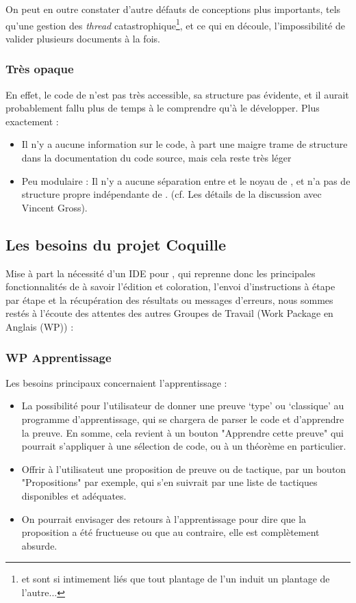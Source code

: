         On peut en outre constater d'autre défauts de conceptions plus importants, tels qu'une gestion des \emph{thread} catastrophique\footnote{\coqtop{} et \coqide{} sont si intimement liés que tout plantage de l'un induit un plantage de l'autre...}, et ce qui en découle, l'impossibilité de valider plusieurs documents à la fois.
			
        \subsubsection{Très opaque}

		En effet, le code de \coqide{} n'est pas très accessible, sa structure pas évidente, et il aurait probablement fallu plus de temps à le comprendre qu'à le développer. Plus exactement :
		\begin{itemize}
			\item Il n'y a aucune information sur le code, à part une maigre trame de structure dans la documentation du code source, mais cela reste très léger
			\item Peu modulaire : Il n'y a aucune séparation entre \coqide{} et le noyau de \coq{}, et \coqide{} n'a pas de structure propre indépendante de \coq{}. (cf. Les détails de la discussion avec Vincent Gross).	
		\end{itemize}
		
	\subsection{Les besoins du projet Coquille}

		Mise à part la nécessité d'un IDE pour \coq{}, qui reprenne donc les principales fonctionnalités de \coqide{} à savoir l'édition et coloration, l'envoi d'instructions à \coqtop{} étape par étape et la récupération des résultats ou messages d'erreurs, nous sommes restés à l'écoute des attentes des autres Groupes de Travail (Work Package en Anglais (WP)) :
        
        \subsubsection{WP Apprentissage}

        Les besoins principaux concernaient l'apprentissage :
		\begin{itemize}
			\item La possibilité pour l'utilisateur de donner une preuve `type' ou `classique' au programme d'apprentissage, qui se chargera de parser le code et d'apprendre la preuve. En somme, cela revient à un bouton "Apprendre cette preuve" qui pourrait s'appliquer à une sélection de code, ou à un théorème en particulier.
			\item Offrir à l'utilisateut une proposition de preuve ou de tactique, par un bouton "Propositions" par exemple, qui s'en suivrait par une liste de tactiques disponibles et adéquates.
			\item On pourrait envisager des retours à l'apprentissage pour dire que la proposition a été fructueuse ou que au contraire, elle est complètement absurde.
		\end{itemize}
			
